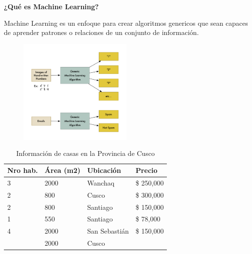 \documentclass[english,svgnames,notes=hide,12pt]{beamer}
\begin{document}
\begin{frame}
    \textbf{¿Qué es Machine Learning?}
    
    Machine Learning es un enfoque para crear algoritmos genericos que sean capaces de aprender patrones o relaciones de un conjunto de informaci\'on.
    \vspace{-1cm}

    \begin{figure}
        \includegraphics[width=0.5\textwidth]{imgs/sample-ml.png}
    \end{figure}
    \vspace{-.5cm}
\end{frame}

\begin{frame}
\begin{table}[]
    \caption{Informaci\'on de casas en la Provincia de Cusco}
    \begin{tabular}{|l|l|l|l|}
        \hline
        \textbf{Nro hab.} & \textbf{Área (m2)} & \textbf{Ubicación}     & \textbf{Precio}     \\ \hline
        3                & 2000      & Wanchaq       & \$ 250,000 \\ \hline
        2                & 800       & Cusco         & \$ 300,000 \\ \hline
        2                & 800       & Santiago      & \$ 150,000 \\ \hline
        1                & 550       & Santiago      & \$ 78,000  \\ \hline
        4                & 2000      & San Sebastián & \$ 150,000 \\ \hline
        \uncover<2->{\color{red}
        3                & \color{red} 2000      & \color{red}Cusco         & \color{red}{\$ ???????} } \\ \hline
    \end{tabular}
\end{table}

\end{frame}
\end{document}
